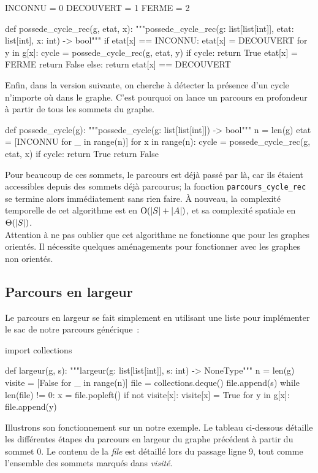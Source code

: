 \documentclass{magnolia}
\begin{document}
\begin{pythoncodeline}
INCONNU = 0
DECOUVERT = 1
FERME = 2

def possede_cycle_rec(g, etat, x):
    """possede_cycle_rec(g: list[list[int]], etat: list[int], x: int) -> bool"""
    if etat[x] == INCONNU:
        etat[x] = DECOUVERT
        for y in g[x]:
            cycle = possede_cycle_rec(g, etat, y)
            if cycle:
                return True
        etat[x] = FERME
        return False
    else:
        return etat[x] == DECOUVERT
\end{pythoncodeline}
\noindent
Enfin, dans la version suivante, on cherche à détecter la présence d'un cycle n'importe
où dans le graphe. C'est pourquoi on lance un parcours en profondeur à partir de tous
les sommets du graphe. 
\begin{pythoncodeline}
def possede_cycle(g):
    """possede_cycle(g: list[list[int]]) -> bool"""
    n = len(g)
    etat = [INCONNU for _ in range(n)]
    for x in range(n):
        cycle = possede_cycle_rec(g, etat, x)
        if cycle:
            return True
    return False
\end{pythoncodeline}
\noindent
Pour beaucoup de ces sommets, le parcours est déjà passé par là, car ils
étaient accessibles depuis des sommets déjà parcourus; la fonction
\verb!parcours_cycle_rec! se termine alors immédiatement sans rien faire. À nouveau,
la complexité temporelle de cet algorithme est en ${\rm O}(\left|S\right|+\left|A\right|)$, et sa complexité spatiale en $\Theta(\left|S\right|)$.\\

Attention à ne pas oublier que cet algorithme ne fonctionne que pour les graphes orientés.
Il nécessite quelques aménagements pour fonctionner avec les graphes non orientés.

\subsection{Parcours en largeur}

Le parcours en largeur se fait simplement en utilisant une liste pour implémenter le
sac de notre parcours générique~:

\begin{pythoncodeline}
import collections

def largeur(g, s):
    """largeur(g: list[list[int]], s: int) -> NoneType""" 
    n = len(g)
    visite = [False for _ in range(n)]
    file = collections.deque()
    file.append(s)
    while len(file) != 0:
        x = file.popleft()
        if not visite[x]:
            visite[x] = True
            for y in g[x]:
                file.append(y)
\end{pythoncodeline}
\noindent
Illustrons son fonctionnement sur un notre exemple. Le tableau ci-dessous détaille
les différentes étapes du parcours en largeur du graphe précédent à partir du sommet 0.
Le contenu de la \emph{file} est détaillé lors du passage ligne 9, tout comme
l'ensemble des sommets marqués dans \emph{visité}.
\end{document}
